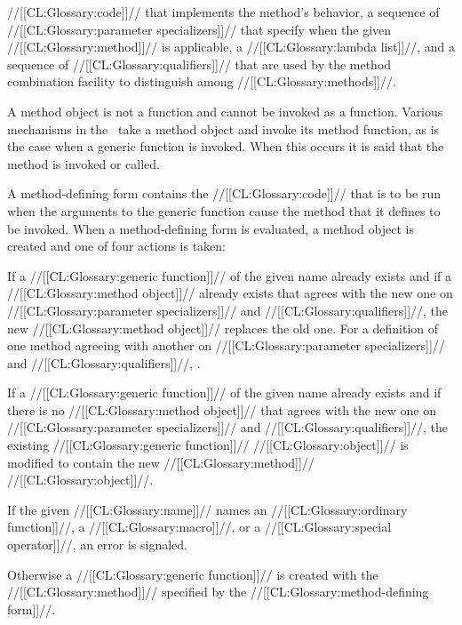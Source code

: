      //[[CL:Glossary:code]]// that implements the method's behavior,
     a sequence of //[[CL:Glossary:parameter specializers]]// 
       that specify when the given //[[CL:Glossary:method]]// is applicable,
     a //[[CL:Glossary:lambda list]]//,
 and a sequence of //[[CL:Glossary:qualifiers]]// that are used by the method combination
       facility to distinguish among //[[CL:Glossary:methods]]//.

A method object is not a function and cannot be invoked as a function. 
Various mechanisms in the \OS\ take a method object and invoke its method
function, as is the case when a generic function is invoked.  When this
occurs it is said that the method is invoked or called.

A method-defining form contains the //[[CL:Glossary:code]]// that is to be run when the
arguments to the generic function cause the method that it defines to
be invoked.  When a method-defining form is evaluated, a method object
is created and one of four actions is taken:

\beginlist

\itemitem{\bull} If a //[[CL:Glossary:generic function]]// of the given name already exists
and if a //[[CL:Glossary:method object]]// already exists that agrees with the new one on
//[[CL:Glossary:parameter specializers]]// and //[[CL:Glossary:qualifiers]]//, the new //[[CL:Glossary:method object]]// replaces
the old one.  For a definition of one method agreeing with another on
//[[CL:Glossary:parameter specializers]]// and //[[CL:Glossary:qualifiers]]//, 
\seesection\SpecializerQualifierAgreement.

\itemitem{\bull} If a //[[CL:Glossary:generic function]]// of the given name already exists
and if there is no //[[CL:Glossary:method object]]// that agrees with the new one on
//[[CL:Glossary:parameter specializers]]// and //[[CL:Glossary:qualifiers]]//, the existing //[[CL:Glossary:generic function]]//
//[[CL:Glossary:object]]// is modified to contain the new //[[CL:Glossary:method]]// //[[CL:Glossary:object]]//.

\itemitem{\bull} If the given //[[CL:Glossary:name]]// names an //[[CL:Glossary:ordinary function]]//, a //[[CL:Glossary:macro]]//,
or a //[[CL:Glossary:special operator]]//, an error is signaled.

\itemitem{\bull} Otherwise a //[[CL:Glossary:generic function]]// is created with the //[[CL:Glossary:method]]//
specified by the //[[CL:Glossary:method-defining form]]//.

\endlist

